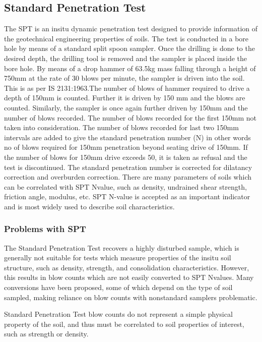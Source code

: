 \subsection{Standard Penetration Test}
The SPT is an in\-situ dynamic penetration test designed to provide information of the geotechnical engineering properties of soils. The test is conducted in a bore hole by means of a standard split spoon sampler. Once the drilling is done to the desired depth, the drilling tool is removed and the sampler is placed inside the bore hole. By means of a drop hammer of 63.5kg mass falling through a height of 750mm at the rate of 30 blows per minute, the sampler is driven into the soil. This is as per IS 2131:1963.The number of blows of hammer required to drive a depth of 150mm is counted. Further it is driven by 150 mm and the blows are counted. Similarly, the sampler is once again further driven by 150mm and the number of blows recorded. The number of blows recorded for the first 150mm not taken into consideration. The number of blows recorded for last two 150mm intervals are added to give the standard penetration number (N) in other words no of blows required for 150mm penetration beyond seating drive of 150mm. If the number of blows for 150mm drive exceeds 50, it is taken as refusal and the test is discontinued. The standard penetration number is corrected for dilatancy correction and overburden correction. There are many parameters of soils which can be correlated with SPT N\-value, such as density, undrained shear strength, friction angle, modulus, etc. SPT N-value is accepted as an important indicator and is most widely used to describe soil characteristics.\cite{mahoto_bearing_2012}
\subsubsection{Problems with SPT}
The Standard Penetration Test recovers a highly disturbed sample, which is generally not suitable for tests which measure properties of the in\-situ soil structure, such as density, strength, and consolidation characteristics. However, this results in blow counts which are not easily converted to SPT N\-values.  Many conversions have been proposed, some of which depend on the type of soil sampled, making reliance on blow counts with non\-standard samplers problematic.
\par
Standard Penetration Test blow counts do not represent a simple physical property of the soil, and thus must be correlated to soil properties of interest, such as strength or density.
